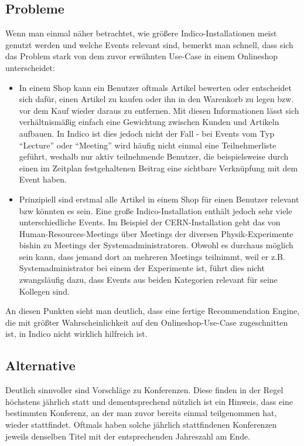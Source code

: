 \subsection{Probleme}

Wenn man einmal näher betrachtet, wie größere Indico-Installationen meist genutzt werden und welche
Events relevant sind, bemerkt man schnell, dass sich das Problem stark von dem zuvor erwähnten
Use-Case in einem Onlineshop unterscheidet:

\begin{itemize}

\item In einem Shop kann ein Benutzer oftmals Artikel bewerten oder entscheidet sich dafür, einen
Artikel zu kaufen oder ihn in den Warenkorb zu legen bzw. vor dem Kauf wieder daraus zu entfernen.
Mit diesen Informationen lässt sich verhältnismäßig einfach eine Gewichtung zwischen Kunden und
Artikeln aufbauen. In Indico ist dies jedoch nicht der Fall - bei Events vom Typ \enquote{Lecture}
oder \enquote{Meeting} wird häufig nicht einmal eine Teilnehmerliste geführt, weshalb nur aktiv
teilnehmende Benutzer, die beispielsweise durch einen im Zeitplan festgehaltenen Beitrag eine
sichtbare Verknüpfung mit dem Event haben.

\item Prinzipiell sind erstmal alle Artikel in einem Shop für einen Benutzer relevant bzw könnten es
sein. Eine große Indico-Installation enthält jedoch sehr viele unterschiedliche Events. Im Beispiel
der CERN-Installation geht das von Human-Resources-Meetings über Meetings der diversen
Physik-Experimente bishin zu Meetings der Systemadministratoren. Obwohl es durchaus möglich sein
kann, dass jemand dort an mehreren Meetings teilnimmt, weil er z.B. Systemadministrator bei einem
der Experimente ist, führt dies nicht zwangsläufig dazu, dass Events aus beiden Kategorien relevant
für seine Kollegen sind.

\end{itemize}

An diesen Punkten sieht man deutlich, dass eine fertige Recommendation Engine, die mit größter
Wahrscheinlichkeit auf den Onlineshop-Use-Case zugeschnitten ist, in Indico nicht wirklich hilfreich
ist.


\subsection{Alternative}

Deutlich sinnvoller sind Vorschläge zu Konferenzen. Diese finden in der Regel höchstens jährlich
statt und dementsprechend nützlich ist ein Hinweis, dass eine bestimmten Konferenz, an der man zuvor
bereits einmal teilgenommen hat, wieder stattfindet. Oftmals haben solche jährlich stattfindenen
Konferenzen jeweils denselben Titel mit der entsprechenden Jahreszahl am Ende.

